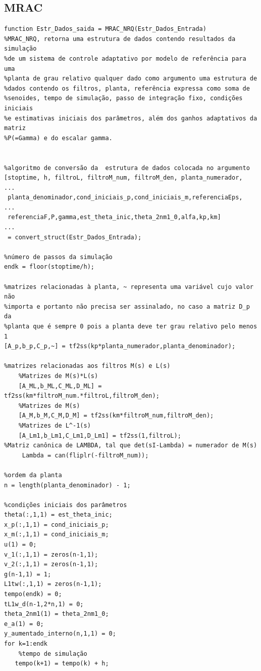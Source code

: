 \documentclass[11pt]{report}
\begin{document}
\subsection{MRAC}

\begin{verbatim}
function Estr_Dados_saida = MRAC_NRQ(Estr_Dados_Entrada)
%MRAC_NRQ, retorna uma estrutura de dados contendo resultados da simulação
%de um sistema de controle adaptativo por modelo de referência para uma
%planta de grau relativo qualquer dado como argumento uma estrutura de
%dados contendo os filtros, planta, referência expressa como soma de
%senoides, tempo de simulação, passo de integração fixo, condições iniciais
%e estimativas iniciais dos parâmetros, além dos ganhos adaptativos da matriz
%P(=Gamma) e do escalar gamma.


%algoritmo de conversão da  estrutura de dados colocada no argumento
[stoptime, h, filtroL, filtroM_num, filtroM_den, planta_numerador,  ...
 planta_denominador,cond_iniciais_p,cond_iniciais_m,referenciaEps,  ...   
 referenciaF,P,gamma,est_theta_inic,theta_2nm1_0,alfa,kp,km]                                ...
 = convert_struct(Estr_Dados_Entrada);

%número de passos da simulação
endk = floor(stoptime/h);

%matrizes relacionadas à planta, ~ representa uma variável cujo valor não
%importa e portanto não precisa ser assinalado, no caso a matriz D_p da
%planta que é sempre 0 pois a planta deve ter grau relativo pelo menos 1
[A_p,b_p,C_p,~] = tf2ss(kp*planta_numerador,planta_denominador);

%matrizes relacionadas aos filtros M(s) e L(s)
    %Matrizes de M(s)*L(s)
    [A_ML,b_ML,C_ML,D_ML] = tf2ss(km*filtroM_num.*filtroL,filtroM_den);
    %Matrizes de M(s)
    [A_M,b_M,C_M,D_M] = tf2ss(km*filtroM_num,filtroM_den);
    %Matrizes de L^-1(s)
    [A_Lm1,b_Lm1,C_Lm1,D_Lm1] = tf2ss(1,filtroL);
%Matriz canônica de LAMBDA, tal que det(sI-Lambda) = numerador de M(s)
     Lambda = can(fliplr(-filtroM_num));
    
%ordem da planta
n = length(planta_denominador) - 1;

%condições iniciais dos parâmetros
theta(:,1,1) = est_theta_inic;
x_p(:,1,1) = cond_iniciais_p;
x_m(:,1,1) = cond_iniciais_m;
u(1) = 0;
v_1(:,1,1) = zeros(n-1,1);
v_2(:,1,1) = zeros(n-1,1);
g(n-1,1) = 1;
L1tw(:,1,1) = zeros(n-1,1); 
tempo(endk) = 0;
tL1w_d(n-1,2*n,1) = 0;
theta_2nm1(1) = theta_2nm1_0;
e_a(1) = 0;
y_aumentado_interno(n,1,1) = 0;
for k=1:endk
    %tempo de simulação
   tempo(k+1) = tempo(k) + h;
   

\end{verbatim}
\end{document}
